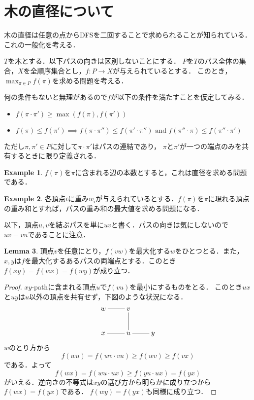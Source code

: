 \documentclass{scrartcl}
\theoremstyle{definition}
\newtheorem{lemma}{Lemma}
\newtheorem{example}[lemma]{Example}
\begin{document}
\section{木の直径について}

木の直径は任意の点からDFSを二回することで求められることが知られている．これの一般化を考える．

$T$を木とする．以下パスの向きは区別しないことにする．
$P$を$T$のパス全体の集合，$X$を全順序集合とし，$f: P \to X$が与えられているとする．
このとき，$\max_{\pi \in P} f(\pi)$を求める問題を考える．

何の条件もないと無理があるので$f$が以下の条件を満たすことを仮定してみる．
\begin{itemize}
\item $f(\pi \cdot \pi') \ge \max(f(\pi), f(\pi'))$
\item $f(\pi) \le f(\pi') \implies f(\pi \cdot \pi'') \le f(\pi' \cdot \pi'')
  \text{ and } f(\pi'' \cdot \pi) \le f(\pi'' \cdot \pi')$
\end{itemize}
ただし$\pi, \pi' \in P$に対して$\pi \cdot \pi'$はパスの連結であり，
$\pi$と$\pi'$が一つの端点のみを共有するときに限り定義される．

\begin{example}
  $f(\pi)$を$\pi$に含まれる辺の本数とすると，これは直径を求める問題である．
\end{example}

\begin{example}
  各頂点$i$に重み$w_i$が与えられているとする．$f(\pi)$を$\pi$に現れる頂点の重み和とすれば，パスの重み和の最大値を求める問題になる．
\end{example}

以下，頂点$u, v$を結ぶパスを単に$uv$と書く．パスの向きは気にしないので$uv=vu$であることに注意．

\begin{lemma}
  頂点$v$を任意にとり，$f(vw)$を最大化する$w$をひとつとる．また，$x, y$は$f$を最大化するあるパスの両端点とする．このとき$f(xy) = f(wx) = f(wy)$が成り立つ．
\end{lemma}
\begin{proof}
  $xy$-pathに含まれる頂点$u$で$f(vu)$を最小にするものをとる．
  このとき$ux$と$uy$は$u$以外の頂点を共有せず，下図のような状況になる．
  \begin{displaymath}
    \xymatrix{
      w \ar@{-}[r]& v \\
      x \ar@{-}[r]& u \ar@{-}[u] \ar@{-}[r] & y
    }
  \end{displaymath}
  $w$のとり方から
  \begin{displaymath}
    f(wu) = f(wv \cdot vu) \ge f(wv) \ge f(vx)
  \end{displaymath}
  である．よって
  \begin{displaymath}
    f(wx) = f(wu \cdot ux) \ge f(yu \cdot ux) = f(yx)
  \end{displaymath}
  がいえる．逆向きの不等式は$xy$の選び方から明らかに成り立つから$f(wx) = f(yx)$である．
  $f(wy) = f(yx)$も同様に成り立つ．
\end{proof}
\end{document}
